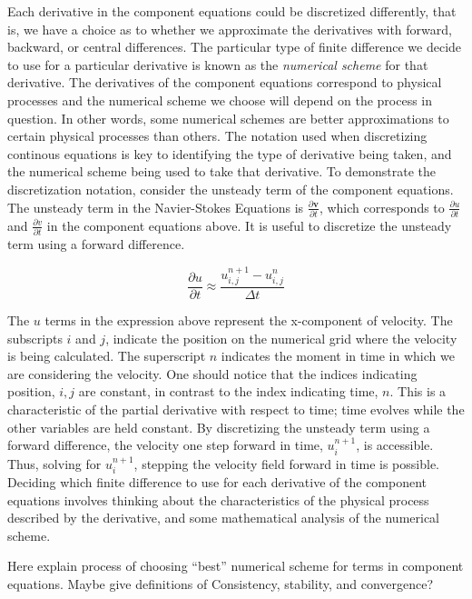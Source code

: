 \documentclass[twocolumn,12pth]{article}
\begin{document}
Each derivative in the component equations could be discretized differently, that is, we have a choice as to whether we approximate the derivatives with forward, backward, or central differences.
The particular type of finite difference we decide to use for a particular derivative is known as the \textit{numerical scheme} for that derivative.
The derivatives of the component equations correspond to physical processes and the numerical scheme we choose will depend on the process in question.
In other words, some numerical schemes are better approximations to certain physical processes than others.
The notation used when discretizing continous equations is key to identifying the type of derivative being taken, and the numerical scheme being used to take that derivative.
To demonstrate the discretization notation, consider the unsteady term of the component equations.
The unsteady term in the Navier-Stokes Equations is $\frac{\partial{\mathbf{v}}}{\partial{t}}$, which corresponds to $\frac{\partial{u}}{\partial{t}}$ and $\frac{\partial{v}}{\partial{t}}$ in the component equations above.
It is useful to discretize the unsteady term using a forward difference.

\begin{equation}
\frac{\partial{u}}{\partial{t}} \approx \frac{u_{i,j}^{n+1} - u_{i,j}^{n}}{\Delta{t}}
\end{equation}

The $u$ terms in the expression above represent the x-component of velocity.
The subscripts $i$ and $j$, indicate the position on the numerical grid where the velocity is being calculated.
The superscript $n$ indicates the moment in time in which we are considering the velocity.
One should notice that the indices indicating position, $i,j$ are constant, in contrast to the index indicating time, $n$.
This is a characteristic of the partial derivative with respect to time; time evolves while the other variables are held constant.
By discretizing the unsteady term using a forward difference, the velocity one step forward in time, $u_{i}^{n+1}$, is accessible.
Thus, solving for $u_{i}^{n+1}$, stepping the velocity field forward in time is possible.
Deciding which finite difference to use for each derivative of the component equations involves thinking about the characteristics of the physical process described by the derivative, and some mathematical analysis of the numerical scheme.

Here explain process of choosing ``best'' numerical scheme for terms in component equations.
Maybe give definitions of Consistency, stability, and convergence?
\end{document}
